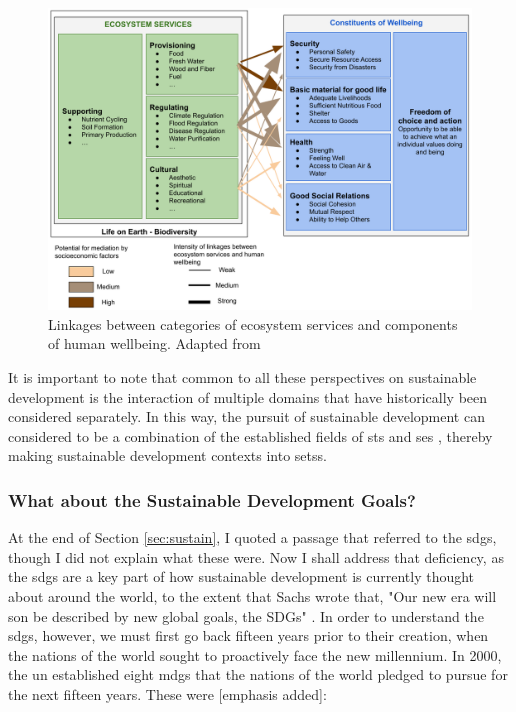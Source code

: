 \begin{figure}[H]
	\centering
	\includegraphics[scale=0.30]{Figures/chap2/services_wellbeing.png}
	\caption[Ecosystem Services \& Human Wellbeing]{Linkages between categories of ecosystem services and components of human wellbeing. Adapted from \cite{reidEcosystemsHumanWellbeing2005}}
	\label{fig:services_wellbeing}
\end{figure}

It is important to note that common to all these perspectives on sustainable development is the interaction of multiple domains that have historically been considered separately. In this way, the pursuit of sustainable development can considered to be a combination of the established fields of \acf{sts} \cite{rouseUnderstandingChangeComplex2012,siddiqiSociotechnicalSystemsSustainability2017,sussmanTeachingComplexSociotechnical2010} and \acf{ses} \cite{elsawahEightGrandChallenges2020}, thereby making sustainable development contexts into \acfp{sets}.

\subsubsection{What about the Sustainable Development Goals?}

At the end of Section \ref{sec:sustain}, I quoted a passage that referred to the \acp{sdg}, though I did not explain what these were. Now I shall address that deficiency, as the \acp{sdg} are a key part of how sustainable development is currently thought about around the world, to the extent that Sachs wrote that, "Our new era will son be described by new global goals, the SDGs" \cite{sachsAgeSustainableDevelopment2015}. In order to understand the \acp{sdg}, however, we must first go back fifteen years prior to their creation, when the nations of the world sought to proactively face the new millennium. In 2000, the \ac{un} established eight \acp{mdg} that the nations of the world pledged to pursue for the next fifteen years. These were [emphasis added]:

